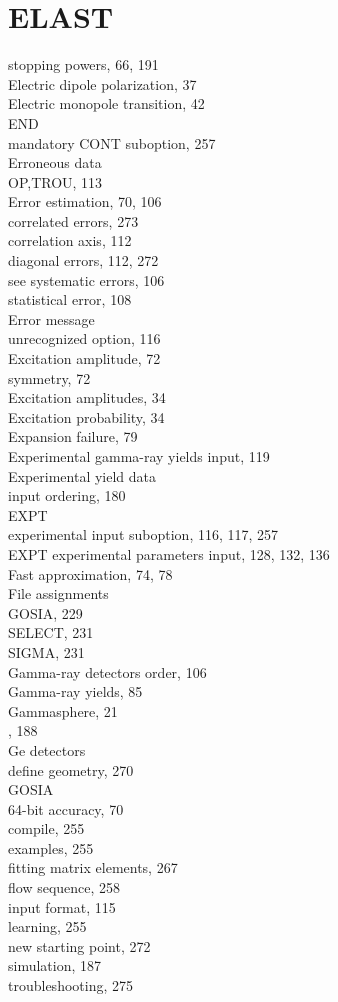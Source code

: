 \documentclass[10pt]{article}
\begin{document}
\section*{ELAST}
stopping powers, 66, 191\\
Electric dipole polarization, 37\\
Electric monopole transition, 42\\
END\\
mandatory CONT suboption, 257\\
Erroneous data\\
OP,TROU, 113\\
Error estimation, 70, 106\\
correlated errors, 273\\
correlation axis, 112\\
diagonal errors, 112, 272\\
see systematic errors, 106\\
statistical error, 108\\
Error message\\
unrecognized option, 116\\
Excitation amplitude, 72\\
symmetry, 72\\
Excitation amplitudes, 34\\
Excitation probability, 34\\
Expansion failure, 79\\
Experimental gamma-ray yields input, 119\\
Experimental yield data\\
input ordering, 180\\
EXPT\\
experimental input suboption, 116, 117, 257\\
EXPT experimental parameters input, 128, 132, 136\\
Fast approximation, 74, 78\\
File assignments\\
GOSIA, 229\\
SELECT, 231\\
SIGMA, 231\\
Gamma-ray detectors order, 106\\
Gamma-ray yields, 85\\
Gammasphere, 21\\
, 188\\
Ge detectors\\
define geometry, 270\\
GOSIA\\
64-bit accuracy, 70\\
compile, 255\\
examples, 255\\
fitting matrix elements, 267\\
flow sequence, 258\\
input format, 115\\
learning, 255\\
new starting point, 272\\
simulation, 187\\
troubleshooting, 275
\end{document}
